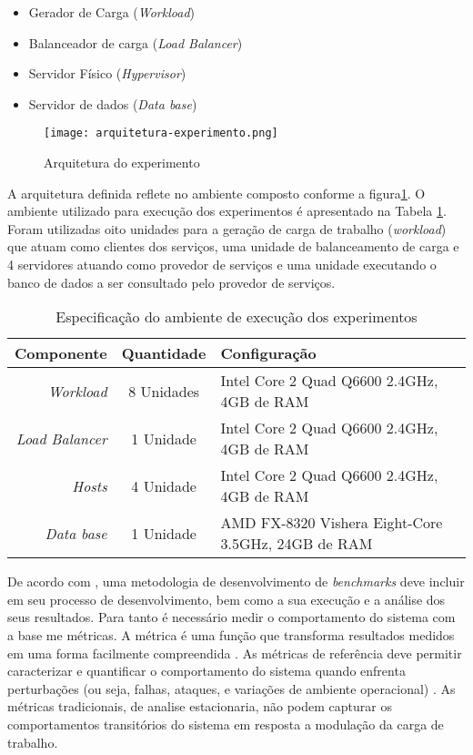 \begin{itemize}
	\item Gerador de Carga (\textit{Workload})
	\item Balanceador de carga (\textit{Load Balancer})
	\item Servidor Físico (\textit{Hypervisor})
	\item Servidor de dados (\textit{Data base})
\end{itemize}


\begin{figure}[!htb]
	\centering
	\texttt{[image: arquitetura-experimento.png]}
	\caption{Arquitetura do experimento}
	\label{fig:arquitetura-experimento}
	\fautor
\end{figure}

A arquitetura definida reflete no ambiente composto conforme a figura\ref{fig:arquitetura-experimento}. O ambiente utilizado para execução dos experimentos é apresentado na Tabela \ref{tab:configuracao_maquinas}.
Foram utilizadas oito unidades para a geração de carga de trabalho (\textit{workload}) que atuam como clientes dos serviços, uma unidade de balanceamento de carga e 4 servidores atuando como provedor de serviços e uma unidade executando o banco de dados a ser consultado pelo provedor de serviços.

\begin{table}[htb]
	\centering
	\caption{Especificação do ambiente de execução dos experimentos}
	\label{tab:configuracao_maquinas}
	\begin{tabularx}{\textwidth}{|r|c|X|} \hline\hline
		\textbf{Componente}    & \textbf{Quantidade} & \textbf{Configuração} \\ \hline
		\textit{Workload}      & 8 Unidades          & Intel Core 2 Quad Q6600 2.4GHz, 4GB de RAM \\
		\textit{Load Balancer} & 1 Unidade           & Intel Core 2 Quad Q6600 2.4GHz, 4GB de RAM \\
		\textit{Hosts}         & 4 Unidade           & Intel Core 2 Quad Q6600 2.4GHz, 4GB de RAM \\
		\textit{Data base}     & 1 Unidade           & AMD FX-8320 Vishera Eight-Core 3.5GHz, 24GB de RAM \\
		\hline
	\end{tabularx}
	\fdadospesquisa
\end{table}

De acordo com , uma metodologia de desenvolvimento de \textit{benchmarks} deve incluir em seu processo de desenvolvimento, bem como a sua execução e a análise dos seus resultados. Para tanto é necessário medir o comportamento do sistema com a base me métricas. A métrica é uma função que transforma resultados medidos em uma forma facilmente compreendida \cite{Folkerts2013}. As métricas de referência deve permitir caracterizar e quantificar o comportamento do sistema quando enfrenta perturbações (ou seja, falhas, ataques, e variações de ambiente operacional) \cite{Marco2012}. As métricas tradicionais, de analise estacionaria, não podem capturar os comportamentos transitórios do sistema em resposta a modulação da carga de trabalho.

